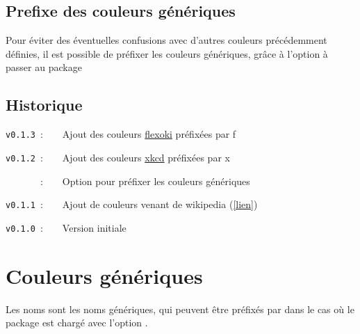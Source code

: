 \documentclass[french,11pt,a4paper]{article}
\begin{document}

\subsection{Prefixe des couleurs génériques}

Pour éviter des éventuelles confusions avec d'autres couleurs précédemment définies, il est possible de préfixer les couleurs génériques, grâce à l'option \MontreCode{[Prefixe]} à passer au package 


\subsection{Historique}

\verb|v0.1.3|~:~~~~Ajout des couleurs \href{https://stephango.com/flexoki}{flexoki} préfixées par \textsf{f}

\verb|v0.1.2|~:~~~~Ajout des couleurs \href{https://xkcd.com/color/rgb.txt}{xkcd} préfixées par \textsf{x}

\verb|      |~:~~~~Option pour préfixer les couleurs génériques

\verb|v0.1.1|~:~~~~Ajout de couleurs venant de wikipedia (\href{https://fr.wikipedia.org/wiki/Liste_de_noms_de_couleur}{[lien]})

\verb|v0.1.0|~:~~~~Version initiale

\vspace*{15mm}

\pagebreak

\section{Couleurs génériques}

Les noms sont les noms génériques, qui peuvent être préfixés par  dans le cas où le package est chargé avec l'option \MontreCode{[Prefixe]}.
%
\end{document}
